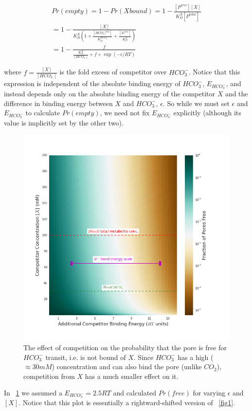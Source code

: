 \documentclass[10pt,a4paper]{article}
\begin{document}
\begin{align}
Pr(empty) = 1 - Pr(X bound) = 1 - \frac{[P^{free}][X]}{K_D^X [P^{total}]} \\
= 1 - \frac{[X]}{K_D^X \left( 1 + \frac{[HCO_3^{-free}]}{K_D^{HCO_3^-}} + \frac{[X^{free}]}{K_D^{X}}\right)} \\
= 1 - \frac{f}{\frac{K_D^X}{[HCO_3^-]} + f + \exp\left(-\epsilon / RT\right)}
\end{align}

where $f = \frac{[X]}{[HCO_3^-]}$ is the fold excess of competitor over $HCO_3^-$. Notice that this expression is independent of the absolute binding energy of $HCO_3^-$, $E_{HCO_3^-}$, and instead depends only on the absolute binding energy of the competitor $X$ and the difference in binding energy between $X$ and $HCO_3^-$, $\epsilon$. So while we must set $\epsilon$ and $E_{HCO_3^-}$ to calculate $Pr(empty)$, we need not fix $E_{HCO_3^-}$ explicitly (although its value is implicitly set by the other two). 

\begin{figure}[ht]
\centering
\includegraphics[scale=0.6]{figures/bicarbonate_competition.png} 
\caption{The effect of competition on the probability that the pore is free for $HCO_3^-$ transit, i.e. is not bound of $X$. Since $HCO_3^-$ has a high ($\approx 30 mM$) concentration and can also bind the pore (unlike $CO_2$), competition from $X$ has a much smaller effect on it.}
\label{fig2}
\end{figure}

In ~\ref{fig2} we assumed a $E_{HCO_3^-} = 2.5 RT$ and calculated $Pr(free)$ for varying $\epsilon$ and $[X]$. Notice that this plot is essentially a rightward-shifted version of ~\ref{fig1}. 
\end{document}
